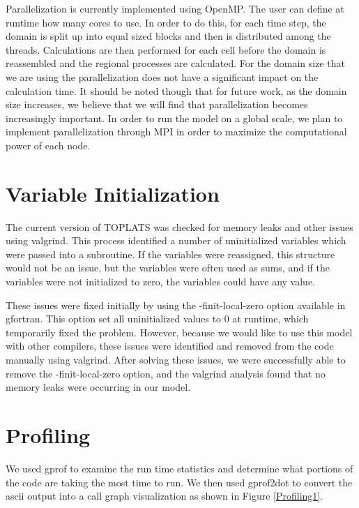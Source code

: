 \documentclass[pdftex,12pt,a4paper]{article}
\begin{document}
Parallelization is currently implemented using OpenMP. The user can define at runtime how many cores to use. In order to do this, for each time step, the domain is split up into equal sized blocks and then is distributed among the threads. Calculations are then performed for each cell before the domain is reassembled and the regional processes are calculated. For the domain size that we are using the parallelization does not have a significant impact on the calculation time. It should be noted though that for future work, as the domain size increases, we believe that we will find that parallelization becomes increasingly important. In order to run the model on a global scale, we plan to implement parallelization through MPI in order to maximize the computational power of each node.

\section{Variable Initialization}
The current version of TOPLATS was checked for memory leaks and other issues using valgrind. This process identified a number of uninitialized variables which were passed into a subroutine. If the variables were reassigned, this structure would not be an issue, but the variables were often used as sums, and if the variables were not initialized to zero, the variables could have any value. 

These issues were fixed initially by using the -finit-local-zero option available in gfortran. This option set all uninitialized values to 0 at runtime, which temporarily fixed the problem. However, because we would like to use this model with other compilers, these issues were identified and removed from the code manually using valgrind. After solving these issues, we were successfully able to remove the -finit-local-zero option, and the valgrind analysis found that no memory leaks were occurring in our model.

\section{Profiling}

We used gprof to examine the run time statistics and determine what portions of the code are taking the most time to run. We then used gprof2dot to convert the ascii output into a call graph visualization as shown in Figure \ref{Profiling1}. 
\end{document}
